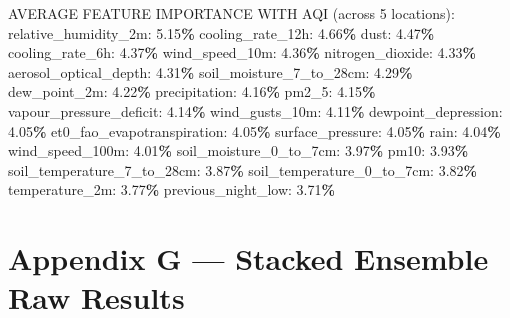 \documentclass[
  letterpaper,
  DIV=11,
  numbers=noendperiod]{scrartcl}
\newenvironment{Shaded}{\begin{snugshade}}{\end{snugshade}}
\newcommand{\DecValTok}[1]{\textcolor[rgb]{0.00,0.00,0.81}{#1}}
\newcommand{\FloatTok}[1]{\textcolor[rgb]{0.00,0.00,0.81}{#1}}
\newcommand{\NormalTok}[1]{#1}
\newcommand{\OperatorTok}[1]{\textcolor[rgb]{0.81,0.36,0.00}{\textbf{#1}}}
\begin{document}
\begin{Shaded}
\begin{Highlighting}[]
\NormalTok{AVERAGE FEATURE IMPORTANCE WITH AQI (across }\DecValTok{5}\NormalTok{ locations):}
\NormalTok{  relative\_humidity\_2m: }\FloatTok{5.15}\OperatorTok{\%}
\NormalTok{  cooling\_rate\_12h: }\FloatTok{4.66}\OperatorTok{\%}
\NormalTok{  dust: }\FloatTok{4.47}\OperatorTok{\%}
\NormalTok{  cooling\_rate\_6h: }\FloatTok{4.37}\OperatorTok{\%}
\NormalTok{  wind\_speed\_10m: }\FloatTok{4.36}\OperatorTok{\%}
\NormalTok{  nitrogen\_dioxide: }\FloatTok{4.33}\OperatorTok{\%}
\NormalTok{  aerosol\_optical\_depth: }\FloatTok{4.31}\OperatorTok{\%}
\NormalTok{  soil\_moisture\_7\_to\_28cm: }\FloatTok{4.29}\OperatorTok{\%}
\NormalTok{  dew\_point\_2m: }\FloatTok{4.22}\OperatorTok{\%}
\NormalTok{  precipitation: }\FloatTok{4.16}\OperatorTok{\%}
\NormalTok{  pm2\_5: }\FloatTok{4.15}\OperatorTok{\%}
\NormalTok{  vapour\_pressure\_deficit: }\FloatTok{4.14}\OperatorTok{\%}
\NormalTok{  wind\_gusts\_10m: }\FloatTok{4.11}\OperatorTok{\%}
\NormalTok{  dewpoint\_depression: }\FloatTok{4.05}\OperatorTok{\%}
\NormalTok{  et0\_fao\_evapotranspiration: }\FloatTok{4.05}\OperatorTok{\%}
\NormalTok{  surface\_pressure: }\FloatTok{4.05}\OperatorTok{\%}
\NormalTok{  rain: }\FloatTok{4.04}\OperatorTok{\%}
\NormalTok{  wind\_speed\_100m: }\FloatTok{4.01}\OperatorTok{\%}
\NormalTok{  soil\_moisture\_0\_to\_7cm: }\FloatTok{3.97}\OperatorTok{\%}
\NormalTok{  pm10: }\FloatTok{3.93}\OperatorTok{\%}
\NormalTok{  soil\_temperature\_7\_to\_28cm: }\FloatTok{3.87}\OperatorTok{\%}
\NormalTok{  soil\_temperature\_0\_to\_7cm: }\FloatTok{3.82}\OperatorTok{\%}
\NormalTok{  temperature\_2m: }\FloatTok{3.77}\OperatorTok{\%}
\NormalTok{  previous\_night\_low: }\FloatTok{3.71}\OperatorTok{\%}
\end{Highlighting}
\end{Shaded}

\section{Appendix G --- Stacked Ensemble Raw
Results}\label{appendix-g-stacked-ensemble-raw-results}
\end{document}
